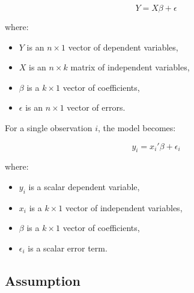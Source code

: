 \documentclass[11pt]{article}
\begin{document}
\[
Y = X \beta + \epsilon
\]

where:
\begin{itemize}
    \item \(Y\) is an \(n \times 1\) vector of dependent variables,
    \item \(X\) is an \(n \times k\) matrix of independent variables,
    \item \(\beta\) is a \(k \times 1\) vector of coefficients,
    \item \(\epsilon\) is an \(n \times 1\) vector of errors.
\end{itemize}

For a single observation \(i\), the model becomes:

\[
y_i = x_i' \beta + \epsilon_i
\]

where:
\begin{itemize}
    \item \(y_i\) is a scalar dependent variable,
    \item \(x_i\) is a \(k \times 1\) vector of independent variables,
    \item \(\beta\) is a \(k \times 1\) vector of coefficients,
    \item \(\epsilon_i\) is a scalar error term.
\end{itemize}

\subsection{Assumption}
\end{document}
